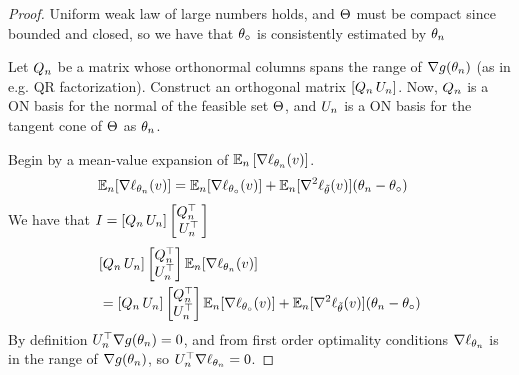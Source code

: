 \begin{proof}

    Uniform weak law of large numbers holds, and $\Theta$ must be compact since bounded and closed, so we have that $\theta_\circ$ is consistently estimated by $\theta_n$

    Let $Q_n$ be a matrix whose orthonormal columns spans the range of $\nabla g( \theta_n)$ (as in e.g. QR factorization).
    Construct an orthogonal matrix $[Q_n \, U_n]$.
    Now, $Q_n$ is a ON basis for the normal of the feasible set $\Theta$, and $U_n$ is a ON basis for the tangent cone of $\Theta$ as $\theta_n$.

    Begin by a mean-value expansion of $\mathbb{E}_n \left[ \nabla \ell_{ \theta_n}(v)\right]$.
    \begin{align}
        \mathbb{E}_n[ \nabla \ell_{ \theta_n}(v)] & = \mathbb{E}_n[ \nabla \ell_{\theta_\circ}(v)] + \mathbb{E}_n[ \nabla^2  \ell_{\tilde {\theta}}(v)] ( \theta_n - \theta_\circ)
    \end{align}
    We have that $I=[Q_n\,U_n]\begin{bmatrix}Q_n^\top\ \\ U_n^\top\end{bmatrix}$%
    \begin{align}
         & [Q_n\,U_n]\begin{bmatrix}Q_n^\top \\ U_n^\top\end{bmatrix}\mathbb{E}_n [\nabla \ell_{ \theta_n}(v)]                                                                                                                  \\
         & = [Q_n\,U_n]\begin{bmatrix}Q_n^\top \\ U_n^\top\end{bmatrix}  \mathbb{E}_n [\nabla\ell_{\theta_\circ}(v)] +  \mathbb{E}_n [\nabla^2\ell_{\tilde {\theta}}(v)] ( \theta_n - \theta_\circ)
    \end{align}
    By definition $U_n^\top\nabla g( \theta_n)=0$, and from first order optimality conditions $\nabla \ell_{ \theta_n}$ is in the range of $\nabla g( \theta_n)$, so $U_n^\top\nabla \ell_{ \theta_n} =0$.


\end{proof}
